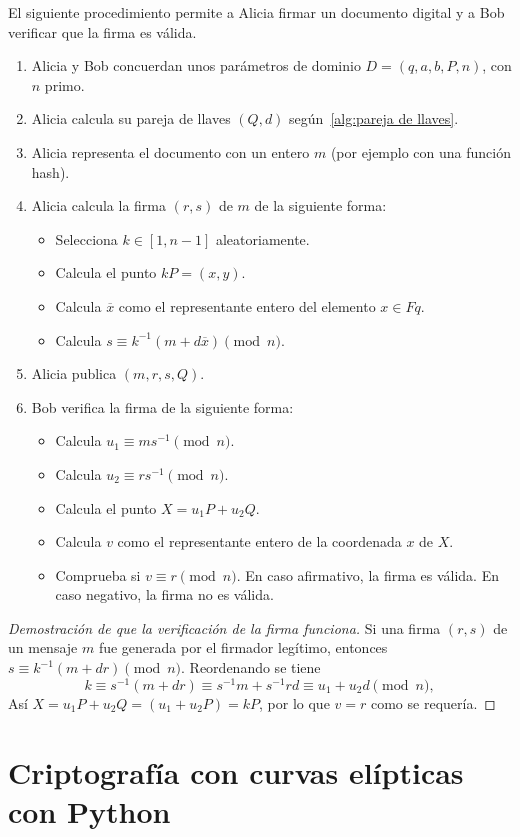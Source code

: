 \begin{protocolo}[ECDSA]
    El siguiente procedimiento permite a Alicia firmar un documento digital y a Bob verificar que la firma es válida.
    \begin{enumerate}
        \item Alicia y Bob concuerdan unos parámetros de dominio $D = (q, a, b, P, n)$, con $n$ primo.
        \item Alicia calcula su pareja de llaves $(Q, d)$ según~\ref{alg:pareja de llaves}.
        \item Alicia representa el documento con un entero $m$ (por ejemplo con una función hash).
        \item Alicia calcula la firma $(r, s)$ de $m$ de la siguiente forma:
        \begin{itemize}
            \item Selecciona $k \in [1, n - 1]$ aleatoriamente.
            \item Calcula el punto $k P = (x, y)$.
            \item Calcula $\overline{x}$ como el representante entero del elemento $x \in Fq$.
            \item Calcula $s \equiv k^{-1} (m + d \overline{x}) \pmod{n}$.
        \end{itemize}
        \item Alicia publica $(m, r, s, Q)$.
        \item Bob verifica la firma de la siguiente forma:
        \begin{itemize}
            \item Calcula $u_1 \equiv m s^{-1} \pmod{n}$.
            \item Calcula $u_2 \equiv r s^{-1} \pmod{n}$.
            \item Calcula el punto $X = u_1 P + u_2 Q$.
            \item Calcula $v$ como el representante entero de la coordenada $x$ de $X$.
            \item Comprueba si $v \equiv r \pmod{n}$. En caso afirmativo, la firma es válida. En caso negativo, la firma no es válida.
        \end{itemize}
    \end{enumerate}
\end{protocolo}
\begin{proof}[Demostración de que la verificación de la firma funciona]
Si una firma $(r, s)$ de un mensaje $m$ fue generada por el firmador legítimo, entonces $s \equiv k^{-1} (m + d r) \pmod{n}$. Reordenando se tiene
$$
    k \equiv s^{-1} (m + d r) \equiv s^{-1} m + s^{-1} r d \equiv u_1 + u_2 d \pmod{n},
$$
Así $X = u_1 P + u_2 Q = (u_1 + u_2 P) = k P$, por lo que $v = r$ como se requería.
\end{proof}


\section{Criptografía con curvas elípticas con Python}
\label{sec:Criptografía con curvas elípticas con Python}
